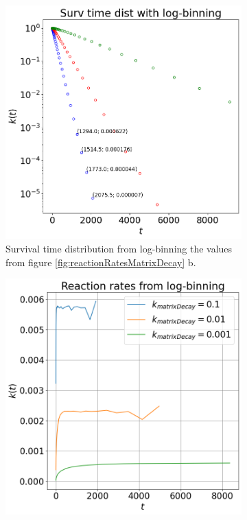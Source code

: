 \documentclass{article}
\begin{document}
\begin{figure}[htbp]
    \centering
    \begin{subfigure}[b]{0.48\textwidth}
        \centering
        \includegraphics[width=\textwidth]{images/survTimeDistLogBinsMatrixdecay.png}
        \caption{Survival time distribution from log-binning the values from figure \ref{fig:reactionRatesMatrixDecay} b.}
    \end{subfigure}
    \hfill
    \begin{subfigure}[b]{0.48\textwidth}
        \centering
        \includegraphics[width=\textwidth]{images/ratesMatrixDecayLog.png}

\end{subfigure}
\end{figure}
\end{document}
